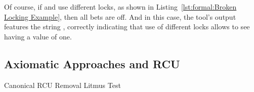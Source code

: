 Of course, if  and  use different locks, as shown in
Listing~\ref{lst:formal:Broken Locking Example},
then all bets are off.
And in this case, the  tool's output features the string
, correctly indicating that use of different locks allows
 to see  having a value of one.

\subsection{Axiomatic Approaches and RCU}
\label{sec:formal:Axiomatic Approaches and RCU}

\begin{listing}[tb]

\caption{Canonical RCU Removal Litmus Test}
\label{lst:formal:Canonical RCU Removal Litmus Test}
\end{listing}

